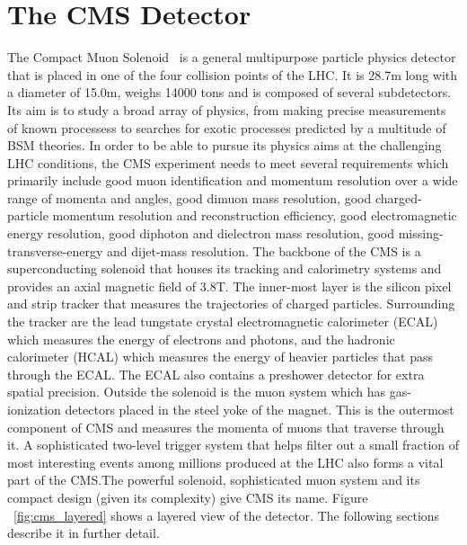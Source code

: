 \section{The CMS Detector}
\label{sec:CMS}
The Compact Muon Solenoid~\cite{cms_exp_ref} is a general multipurpose particle physics detector that is placed in one of the four collision points of the LHC. It is 28.7m long with a diameter of 15.0m, weighs 14000 tons and is composed of several subdetectors. Its aim is to study a broad array of physics, from making precise measurements of known processess to searches for exotic processes predicted by a multitude of BSM theories. In order to be able to pursue its physics aims at the challenging LHC conditions, the CMS experiment needs to meet several requirements which primarily include good muon identification and momentum resolution over a wide range of momenta and angles, good dimuon mass resolution, good charged-particle momentum resolution and reconstruction efficiency, good electromagnetic energy resolution, good diphoton and dielectron mass resolution, good missing-transverse-energy and dijet-mass resolution.
The backbone of the CMS is a superconducting solenoid that houses its tracking and calorimetry systems and provides an axial magnetic field of 3.8T. The inner-most layer is the silicon pixel and strip tracker that measures the trajectories of charged particles. Surrounding the tracker are the lead tungstate crystal electromagnetic calorimeter (ECAL) which measures the energy of electrons and photons, and the hadronic calorimeter (HCAL) which measures the energy of heavier particles that pass through the ECAL. The ECAL also contains a preshower detector for extra spatial precision. Outside the solenoid is the muon system which has gas-ionization detectors placed in the steel yoke of the magnet. This is the outermost component of CMS and measures the momenta of muons that traverse through it. A sophisticated two-level trigger system that helps filter out a small fraction of most interesting events among millions produced at the LHC also forms a vital part of the CMS.The powerful solenoid, sophisticated muon system and its compact design (given its complexity) give CMS its name. Figure ~\ref{fig:cms_layered} shows a layered view of the detector. The following sections describe it in further detail.   

